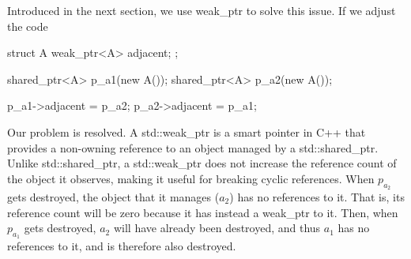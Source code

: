 \documentclass{report}
\begin{document}
Introduced in the next section, we use weak\_ptr to solve this issue. If we adjust the code
\bigbreak \noindent 
\begin{cppcode}
struct A {
    weak_ptr<A> adjacent;
};

shared_ptr<A> p_a1(new A());
shared_ptr<A> p_a2(new A());

p_a1->adjacent = p_a2;
p_a2->adjacent = p_a1;
\end{cppcode}
\bigbreak \noindent 
Our problem is resolved. A std::weak\_ptr is a smart pointer in C++ that provides a non-owning reference to an object managed by a std::shared\_ptr. Unlike std::shared\_ptr, a std::weak\_ptr does not increase the reference count of the object it observes, making it useful for breaking cyclic references.
\bigbreak \noindent 
When $p_{a_2}$ gets destroyed, the object that it manages ($a_2$) has no references to it. That is, its reference count will be zero because it has instead a weak\_ptr to it. Then, when $p_{a_1}$ gets destroyed, $a_2$ will have already been destroyed, and thus $a_1$ has no references to it, and is therefore also destroyed.





\bigbreak \noindent 
\end{document}
